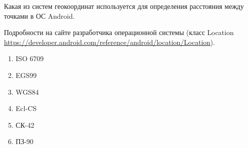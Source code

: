 
Какая из систем геокоординат используется для определения расстояния между точками в ОС Android.

Подробности на сайте разработчика операционной системы (класс Location \url{https://developer.android.com/reference/android/location/Location}).

\begin{enumerate}
    \item ISO 6709
    \item EGS99
    \item WGS84
    \item Ecl-CS
    \item СК-42
    \item ПЗ-90
\end{enumerate}